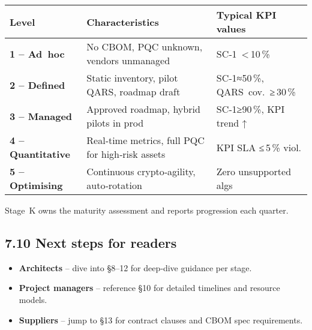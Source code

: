 \documentclass[
  english,
]{article}
\providecommand{\tightlist}{%
  \setlength{\itemsep}{0pt}\setlength{\parskip}{0pt}}
\begin{document}
\begin{longtable}[]{@{}
  >{\raggedright\arraybackslash}p{}
  >{\raggedright\arraybackslash}p{}
  >{\raggedright\arraybackslash}p{}@{}}
\toprule\noalign{}
\begin{minipage}[b]{\linewidth}\raggedright
Level
\end{minipage} & \begin{minipage}[b]{\linewidth}\raggedright
Characteristics
\end{minipage} & \begin{minipage}[b]{\linewidth}\raggedright
Typical KPI values
\end{minipage} \\
\midrule\noalign{}
\endhead
\bottomrule\noalign{}
\endlastfoot
\textbf{1 -- Ad~hoc} & No CBOM, PQC unknown, vendors unmanaged &
SC‑1~\textless\,10\,\% \\
\textbf{2 -- Defined} & Static inventory, pilot QARS, roadmap draft &
SC‑1≈50\,\%, QARS~cov.~≥\,30\,\% \\
\textbf{3 -- Managed} & Approved roadmap, hybrid pilots in prod &
SC‑1≥90\,\%, KPI trend ↑ \\
\textbf{4 -- Quantitative} & Real‑time metrics, full PQC for high‑risk
assets & KPI SLA ≤\,5\,\% viol. \\
\textbf{5 -- Optimising} & Continuous crypto‑agility, auto‑rotation &
Zero unsupported algs \\
\end{longtable}

Stage~K owns the maturity assessment and reports progression each
quarter.

\subsection{7.10 Next steps for readers}\label{next-steps-for-readers}

\begin{itemize}
\tightlist
\item
  \textbf{Architects} -- dive into §8--12 for deep‑dive guidance per
  stage.
\item
  \textbf{Project managers} -- reference §10 for detailed timelines and
  resource models.
\item
  \textbf{Suppliers} -- jump to §13 for contract clauses and CBOM spec
  requirements.
\end{itemize}
\end{document}
